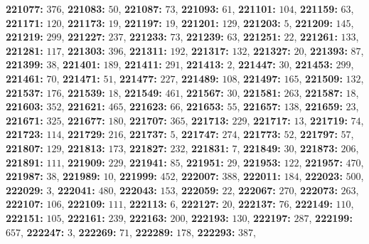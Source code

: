 \textsf{\bfseries 221077:} $376$, \textsf{\bfseries 221083:} $50$, \textsf{\bfseries 221087:} $73$, \textsf{\bfseries 221093:} $61$, \textsf{\bfseries 221101:} $104$, \textsf{\bfseries 221159:} $63$, \textsf{\bfseries 221171:} $120$, \textsf{\bfseries 221173:} $19$, \textsf{\bfseries 221197:} $19$, \textsf{\bfseries 221201:} $129$, \textsf{\bfseries 221203:} $5$, \textsf{\bfseries 221209:} $145$, \textsf{\bfseries 221219:} $299$, \textsf{\bfseries 221227:} $237$, \textsf{\bfseries 221233:} $73$, \textsf{\bfseries 221239:} $63$, \textsf{\bfseries 221251:} $22$, \textsf{\bfseries 221261:} $133$, \textsf{\bfseries 221281:} $117$, \textsf{\bfseries 221303:} $396$, \textsf{\bfseries 221311:} $192$, \textsf{\bfseries 221317:} $132$, \textsf{\bfseries 221327:} $20$, \textsf{\bfseries 221393:} $87$, \textsf{\bfseries 221399:} $38$, \textsf{\bfseries 221401:} $189$, \textsf{\bfseries 221411:} $291$, \textsf{\bfseries 221413:} $2$, \textsf{\bfseries 221447:} $30$, \textsf{\bfseries 221453:} $299$, \textsf{\bfseries 221461:} $70$, \textsf{\bfseries 221471:} $51$, \textsf{\bfseries 221477:} $227$, \textsf{\bfseries 221489:} $108$, \textsf{\bfseries 221497:} $165$, \textsf{\bfseries 221509:} $132$, \textsf{\bfseries 221537:} $176$, \textsf{\bfseries 221539:} $18$, \textsf{\bfseries 221549:} $461$, \textsf{\bfseries 221567:} $30$, \textsf{\bfseries 221581:} $263$, \textsf{\bfseries 221587:} $18$, \textsf{\bfseries 221603:} $352$, \textsf{\bfseries 221621:} $465$, \textsf{\bfseries 221623:} $66$, \textsf{\bfseries 221653:} $55$, \textsf{\bfseries 221657:} $138$, \textsf{\bfseries 221659:} $23$, \textsf{\bfseries 221671:} $325$, \textsf{\bfseries 221677:} $180$, \textsf{\bfseries 221707:} $365$, \textsf{\bfseries 221713:} $229$, \textsf{\bfseries 221717:} $13$, \textsf{\bfseries 221719:} $74$, \textsf{\bfseries 221723:} $114$, \textsf{\bfseries 221729:} $216$, \textsf{\bfseries 221737:} $5$, \textsf{\bfseries 221747:} $274$, \textsf{\bfseries 221773:} $52$, \textsf{\bfseries 221797:} $57$, \textsf{\bfseries 221807:} $129$, \textsf{\bfseries 221813:} $173$, \textsf{\bfseries 221827:} $232$, \textsf{\bfseries 221831:} $7$, \textsf{\bfseries 221849:} $30$, \textsf{\bfseries 221873:} $206$, \textsf{\bfseries 221891:} $111$, \textsf{\bfseries 221909:} $229$, \textsf{\bfseries 221941:} $85$, \textsf{\bfseries 221951:} $29$, \textsf{\bfseries 221953:} $122$, \textsf{\bfseries 221957:} $470$, \textsf{\bfseries 221987:} $38$, \textsf{\bfseries 221989:} $10$, \textsf{\bfseries 221999:} $452$, \textsf{\bfseries 222007:} $388$, \textsf{\bfseries 222011:} $184$, \textsf{\bfseries 222023:} $500$, \textsf{\bfseries 222029:} $3$, \textsf{\bfseries 222041:} $480$, \textsf{\bfseries 222043:} $153$, \textsf{\bfseries 222059:} $22$, \textsf{\bfseries 222067:} $270$, \textsf{\bfseries 222073:} $263$, \textsf{\bfseries 222107:} $106$, \textsf{\bfseries 222109:} $111$, \textsf{\bfseries 222113:} $6$, \textsf{\bfseries 222127:} $20$, \textsf{\bfseries 222137:} $76$, \textsf{\bfseries 222149:} $110$, \textsf{\bfseries 222151:} $105$, \textsf{\bfseries 222161:} $239$, \textsf{\bfseries 222163:} $200$, \textsf{\bfseries 222193:} $130$, \textsf{\bfseries 222197:} $287$, \textsf{\bfseries 222199:} $657$, \textsf{\bfseries 222247:} $3$, \textsf{\bfseries 222269:} $71$, \textsf{\bfseries 222289:} $178$, \textsf{\bfseries 222293:} $387$, 
